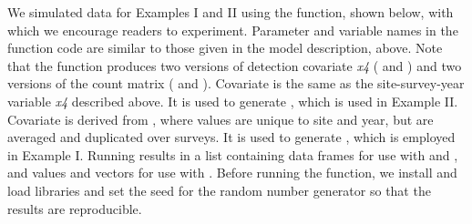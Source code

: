 \documentclass[codesnippet]{jss}
\begin{document}
We simulated data for Examples I and II using the  function, shown below, with which we encourage readers to experiment. Parameter and variable names in the function code are similar to those given in the model description, above. Note that the function produces two versions of detection covariate \textit{x4} ( and ) and two versions of the count matrix ( and ). Covariate  is the same as the site-survey-year variable \textit{x4} described above. It is used to generate , which is used in Example II. Covariate  is derived from , where values are unique to site and year, but are averaged and duplicated over surveys. It is used to generate , which is employed in Example I. Running  results in a list containing data frames for use with  and , and values and vectors for use with . Before running the function, we install and load libraries and set the seed for the random number generator so that the results are reproducible.
\end{document}
